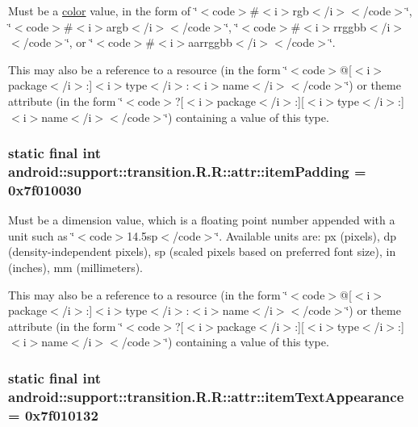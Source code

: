 Must be a \hyperlink{classandroid_1_1support_1_1transition_1_1_r_1_1color}{color} value, in the form of \char`\"{}$<$code$>$\#$<$i$>$rgb$<$/i$>$$<$/code$>$\char`\"{}, \char`\"{}$<$code$>$\#$<$i$>$argb$<$/i$>$$<$/code$>$\char`\"{}, \char`\"{}$<$code$>$\#$<$i$>$rrggbb$<$/i$>$$<$/code$>$\char`\"{}, or \char`\"{}$<$code$>$\#$<$i$>$aarrggbb$<$/i$>$$<$/code$>$\char`\"{}. 

This may also be a reference to a resource (in the form \char`\"{}$<$code$>$@\mbox{[}$<$i$>$package$<$/i$>$:\mbox{]}$<$i$>$type$<$/i$>$:$<$i$>$name$<$/i$>$$<$/code$>$\char`\"{}) or theme attribute (in the form \char`\"{}$<$code$>$?\mbox{[}$<$i$>$package$<$/i$>$:\mbox{]}\mbox{[}$<$i$>$type$<$/i$>$:\mbox{]}$<$i$>$name$<$/i$>$$<$/code$>$\char`\"{}) containing a value of this type. \hypertarget{classandroid_1_1support_1_1transition_1_1_r_1_1attr_39ab27b184c35304040d733636d51763}{
\subsubsection[{itemPadding}]{\setlength{\rightskip}{0pt plus 5cm}static final int android::support::transition.R.R::attr::itemPadding = 0x7f010030}}
\label{classandroid_1_1support_1_1transition_1_1_r_1_1attr_39ab27b184c35304040d733636d51763}


Must be a dimension value, which is a floating point number appended with a unit such as \char`\"{}$<$code$>$14.5sp$<$/code$>$\char`\"{}. Available units are: px (pixels), dp (density-independent pixels), sp (scaled pixels based on preferred font size), in (inches), mm (millimeters). 

This may also be a reference to a resource (in the form \char`\"{}$<$code$>$@\mbox{[}$<$i$>$package$<$/i$>$:\mbox{]}$<$i$>$type$<$/i$>$:$<$i$>$name$<$/i$>$$<$/code$>$\char`\"{}) or theme attribute (in the form \char`\"{}$<$code$>$?\mbox{[}$<$i$>$package$<$/i$>$:\mbox{]}\mbox{[}$<$i$>$type$<$/i$>$:\mbox{]}$<$i$>$name$<$/i$>$$<$/code$>$\char`\"{}) containing a value of this type. \hypertarget{classandroid_1_1support_1_1transition_1_1_r_1_1attr_502aeef98fd65a8774129bb15aebb722}{
\subsubsection[{itemTextAppearance}]{\setlength{\rightskip}{0pt plus 5cm}static final int android::support::transition.R.R::attr::itemTextAppearance = 0x7f010132}}
\label{classandroid_1_1support_1_1transition_1_1_r_1_1attr_502aeef98fd65a8774129bb15aebb722}


